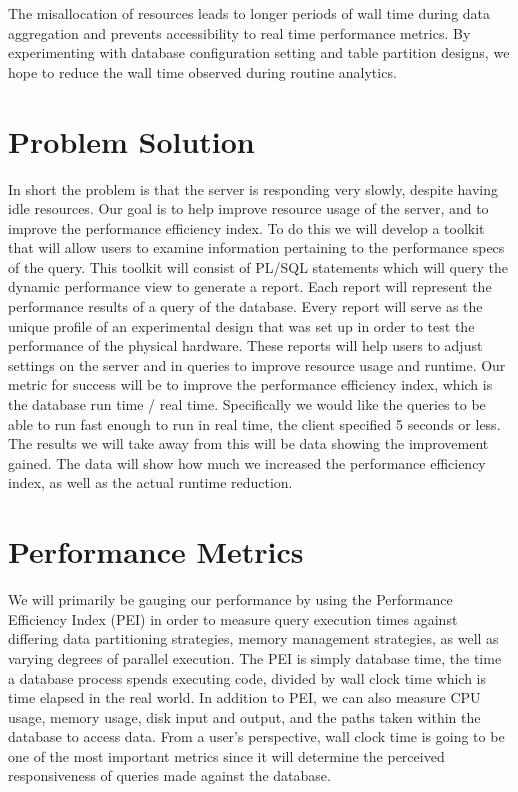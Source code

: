 \documentclass[letterpaper, 10pt]{article}
\begin{document}
The misallocation of resources leads to longer periods of wall time during data aggregation and prevents accessibility to real time performance metrics. By experimenting with database configuration setting and table partition designs, we hope to reduce the wall time observed during routine analytics. 

\section*{Problem Solution}
In short the problem is that the server is responding very slowly, despite having idle resources. Our goal is to help improve resource usage of the server, and to improve the performance efficiency index. To do this we will develop a toolkit that will allow users to examine information pertaining to the performance specs of the query. This toolkit will consist of PL/SQL statements which will query the dynamic performance view to generate a report. Each report will represent the performance results of a query of the database. Every report will serve as the unique profile of an experimental design that was set up in order to test the performance of the physical hardware. These reports will help users to adjust settings on the server and in queries to improve resource usage and runtime. Our metric for success will be to improve the performance efficiency index, which is the database run time / real time. Specifically we would like the queries to be able to run fast enough to run in real time, the client specified 5 seconds or less. The results we will take away from this will be data showing the improvement gained. The data will show how much we increased the performance efficiency index, as well as the actual runtime reduction. 

\section*{Performance Metrics}
We will primarily be gauging our performance by using the Performance Efficiency Index (PEI) in order to measure query execution times against differing data partitioning strategies, memory management strategies, as well as varying degrees of parallel execution. The PEI is simply database time, the time a database process spends executing code, divided by wall clock time which is time elapsed in the real world. In addition to PEI, we can also measure CPU usage, memory usage, disk input and output, and the paths taken within the database to access data. From a user’s perspective, wall clock time is going to be one of the most important metrics since it will determine the perceived responsiveness of queries made against the database.
\end{document}

